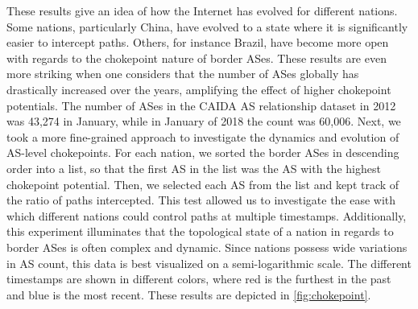 \documentclass{article}
\begin{document}
\begin{multicols}{2}
\par
These results give an idea of how the Internet has evolved for different nations. Some nations,
particularly China, have evolved to a state where it is significantly easier
to intercept paths. Others, for instance Brazil, have become more open with
regards to the chokepoint nature of border ASes. These results are even more
striking when one considers that the number of ASes globally has drastically
increased over the years, amplifying the effect of higher chokepoint
potentials. The number of ASes in the CAIDA AS relationship dataset in 2012
was 43,274 in January, while in January of 2018 the count was 60,006.
Next, we took a more fine-grained approach to investigate the dynamics and
evolution of AS-level chokepoints. For each nation, we sorted the border ASes
in descending order into a list, so that the first AS in the list was the AS
with the highest chokepoint potential. Then, we selected each AS from the list
and kept track of the ratio of paths intercepted. This test allowed us to
investigate the ease with which different nations could control paths at
multiple timestamps. Additionally, this experiment illuminates that the
topological state of a nation in regards to border ASes is often complex and
dynamic. Since nations possess wide variations in AS count, this data is best
visualized on a semi-logarithmic scale. The different timestamps are shown in
different colors, where red is the furthest in the past and blue is the most
recent. These results are depicted in \ref{fig:chokepoint}. 


\end{multicols}
\end{document}
